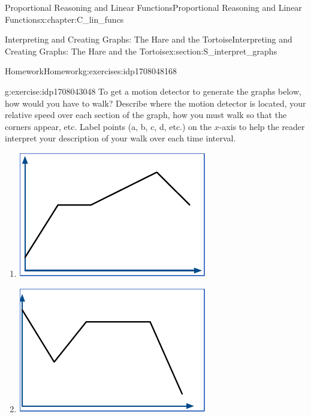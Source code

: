 \documentclass[oneside,10pt,]{book}
\numberwithin{equation}{chapter}
\begin{document}
\begin{chapterptx}{Proportional Reasoning and Linear Functions}{}{Proportional Reasoning and Linear Functions}{}{}{x:chapter:C_lin_funcs}
\begin{sectionptx}{Interpreting and Creating Graphs: The Hare and the Tortoise}{}{Interpreting and Creating Graphs: The Hare and the Tortoise}{}{}{x:section:S_interpret_graphs}
\begin{exercises-subsection}{Homework}{}{Homework}{}{}{g:exercises:idp1708048168}
\begin{divisionexercise}{1}{}{}{g:exercise:idp1708043048}
To get a motion detector to generate the graphs below, how would you have to walk? Describe where the motion detector is located, your relative speed over each section of the graph, how you must walk so that the corners appear, etc. Label points (a, b, c, d, etc.) on the \(x\)-axis to help the reader interpret your description of your walk over each time interval.%
\begin{enumerate}[font=\bfseries,label=(\alph*),ref=\alph*]
\item{}\begin{image}{0.25}{0.5}{0.25}%
\includegraphics[width=\linewidth]{external/exer-walk-graphs-1.pdf}
\end{image}%
%
\item{}\begin{image}{0.25}{0.5}{0.25}%
\includegraphics[width=\linewidth]{external/exer-walk-graphs-2.pdf}
\end{image}%

\end{enumerate}
\end{divisionexercise}
\end{exercises-subsection}
\end{sectionptx}
\end{chapterptx}
\end{document}
